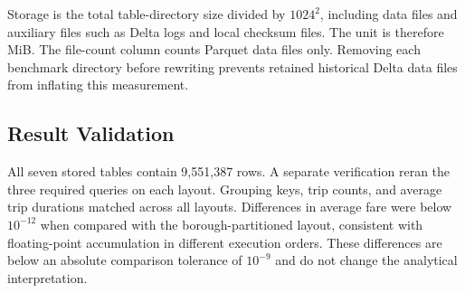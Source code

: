 \documentclass[a4paper,11pt]{article}
\begin{document}
\begin{table}[H]
\centering
\small
{}
\caption{Latest benchmark results. Bold values indicate the lowest median for each timing metric across all seven strategies.}
\label{tab:benchmark_results}
\end{table}

Storage is the total table-directory size divided by $1024^2$, including data files and auxiliary files such as Delta logs and local checksum files. The unit is therefore MiB. The file-count column counts Parquet data files only. Removing each benchmark directory before rewriting prevents retained historical Delta data files from inflating this measurement.

\subsection*{Result Validation}

All seven stored tables contain 9,551,387 rows. A separate verification reran the three required queries on each layout. Grouping keys, trip counts, and average trip durations matched across all layouts. Differences in average fare were below $10^{-12}$ when compared with the borough-partitioned layout, consistent with floating-point accumulation in different execution orders. These differences are below an absolute comparison tolerance of $10^{-9}$ and do not change the analytical interpretation.
\end{document}
